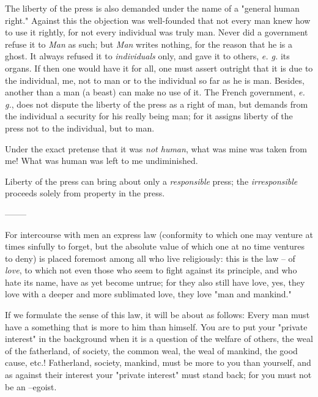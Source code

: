 The liberty of the press is also demanded under the name of a "{}general human 
right."{} Against this the objection was well-founded that not every man knew 
how to use it rightly, for not every individual was truly man. Never did a 
government refuse it to \textit{Man} as such; but \textit{Man} writes nothing, 
for the reason that he is a ghost. It always refused it to 
\textit{individuals} only, and gave it to others, \textit{e. g.} its organs. 
If then one would have it for all, one must assert outright that it is due to 
the individual, me, not to man or to the individual so far as he is man. 
Besides, another than a man (a beast) can make no use of it. The French 
government, \textit{e. g.}, does not dispute the liberty of the press as a 
right of man, but demands from the individual a security for his really being 
man; for it assigns liberty of the press not to the individual, but to man.

Under the exact pretense that it was \textit{not human}, what was mine was 
taken from me! What was human was left to me undiminished.

Liberty of the press can bring about only a \textit{responsible} press; the 
\textit{irresponsible} proceeds solely from property in the press.

\begin{center}
--------\end{center}


For intercourse with men an express law (conformity to which one may venture 
at times sinfully to forget, but the absolute value of which one at no time 
ventures to deny) is placed foremost among all who live religiously: this is 
the law -- of \textit{love}, to which not even those who seem to fight against 
its principle, and who hate its name, have as yet become untrue; for they also 
still have love, yes, they love with a deeper and more sublimated love, they 
love "{}man and mankind."{}

If we formulate the sense of this law, it will be about as follows: Every man 
must have a something that is more to him than himself. You are to put your 
"{}private interest"{} in the background when it is a question of the welfare 
of others, the weal of the fatherland, of society, the common weal, the weal 
of mankind, the good cause, etc.! Fatherland, society, mankind, must be more 
to you than yourself, and as against their interest your "{}private 
interest"{} must stand back; for you must not be an --egoist.

